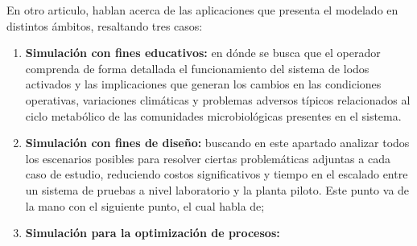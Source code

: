En otro articulo, \cite{Gernaey04} hablan acerca de las aplicaciones que presenta el modelado en distintos ámbitos, resaltando tres casos:
\begin{enumerate}
	\item \textbf{Simulación con fines educativos:} en dónde se busca que el operador comprenda de forma detallada el funcionamiento del sistema de lodos activados y las implicaciones que generan los cambios en las condiciones operativas, variaciones climáticas y problemas adversos típicos relacionados al ciclo metabólico de las comunidades microbiológicas presentes en el sistema.
	\item \textbf{Simulación con fines de diseño:} buscando en este apartado analizar todos los escenarios posibles para resolver ciertas problemáticas adjuntas a cada caso de estudio, reduciendo costos significativos y tiempo en el escalado entre un sistema de pruebas a nivel laboratorio y la planta piloto. Este punto va de la mano con el siguiente punto, el cual habla de;
	\item \textbf{Simulación para la optimización de procesos:} 
\end{enumerate}